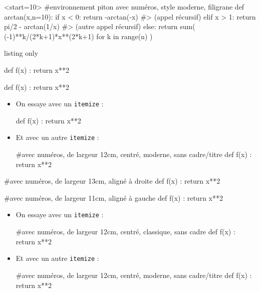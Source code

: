 \begin{CodePiton}[Style=Moderne,Filigrane]{}<start=10>
#environnement piton avec numéros, style moderne, filigrane
def arctan(x,n=10):
	if x < 0:
		return -arctan(-x) #> (appel récursif)
	elif x > 1:
		return pi/2 - arctan(1/x) #> (autre appel récursif)
	else:
		return sum( (-1)**k/(2*k+1)*x**(2*k+1) for k in range(n) )
\end{CodePiton}

\begin{PresCodeTexPL}{listing only}
\begin{CodePiton}[Alignement=flush right,Largeur=13cm]{}
def f(x) :
	return x**2
\end{CodePiton}

\begin{CodePiton}[Alignement=flush left,Largeur=11cm]{}
def f(x) :
	return x**2
\end{CodePiton}

\begin{itemize} %
	\item On essaye avec un \texttt{itemize} :
	\begin{CodePiton}[Gobble=tabs,Largeur=12cm,Style=Classique,Cadre=false]{}
	def f(x) :
		return x**2
	\end{CodePiton}
	\item Et avec un autre \texttt{itemize} :
	\begin{CodePiton}[Gobble=tabs,Largeur=12cm,Style=Moderne,Cadre=false,BarreTitre=false]{}
	#avec numéros, de largeur 12cm, centré, moderne, sans cadre/titre
	def f(x) :
		return x**2
	\end{CodePiton}
\end{itemize}
\vspace*{-\baselineskip}\leavevmode
\end{PresCodeTexPL}

\begin{CodePiton}[Alignement=flush right,Largeur=13cm]{}
#avec numéros, de largeur 13cm, aligné à droite
def f(x) :
	return x**2
\end{CodePiton}

\begin{CodePiton}[Alignement=flush left,Largeur=11cm]{}
#avec numéros, de largeur 11cm, aligné à gauche
def f(x) :
	return x**2
\end{CodePiton}

\begin{itemize}
	\item On essaye avec un \texttt{itemize} :
	\begin{CodePiton}[Gobble=tabs,Largeur=12cm,Cadre=false]{}
	#avec numéros, de largeur 12cm, centré, classique, sans cadre
	def f(x) :
		return x**2
	\end{CodePiton}
	\item Et avec un autre \texttt{itemize} :
	\begin{CodePiton}[Gobble=tabs,Largeur=12cm,Style=Moderne,BarreTitre=false,Cadre=false]{}
	#avec numéros, de largeur 12cm, centré, moderne, sans cadre/titre
	def f(x) :
		return x**2
	\end{CodePiton}
\end{itemize}

